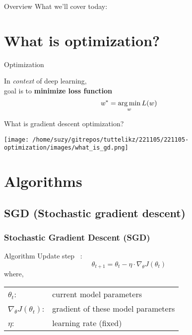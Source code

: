     \begin{frame}{Overview}
      What we'll cover today:
      \tableofcontents
    \end{frame}
    
    \section{What is optimization?} %
    \begin{frame}{Optimization}
      \begin{center}
        \begin{huge}
          In \textit{context} of deep learning, \\
          goal is to \textbf{minimize loss function}
          \vspace{0.2cm}
          \begin{equation}
            \mathit{w}^* = \operatorname*{arg\,min}_{w}L(w)
          \end{equation}
        \end{huge}
      \end{center}
    \end{frame}

    \begin{frame}{What is gradient descent optimization?}
      \begin{center}
          \texttt{[image: /home/suzy/gitrepos/tuttelikz/221105/221105-optimization/images/what\_is\_gd.png]}
      \end{center}
    \end{frame}


    \section{Algorithms} %

    \subsection{SGD (Stochastic gradient descent)}
    \begin{frame}
      \frametitle{Stochastic Gradient Descent (SGD)} %
      \begin{block}{Algorithm}
        Update step ~\cite{ruder2016overview}:
        \begin{equation}
          \theta_{t+1} = \theta_{t} - \eta \cdot \nabla_{\theta}J(\theta_t)
        \end{equation}
        \vskip 0.3cm
        where, \\
        \begin{tabular}{l l}
          $\theta_{t}$: & current model parameters \\
          $\nabla_{\theta}J(\theta_t)$: & gradient of these model parameters \\
          $\eta$: & learning rate (fixed)
        \end{tabular}
        
      \end{block}
    \end{frame}



